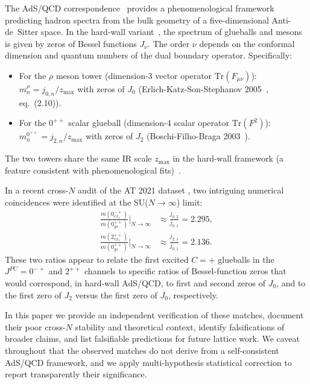 \documentclass[reprint,prd,amsmath,amssymb,nofootinbib,superscriptaddress]{revtex4-2}
\newcommand{\jbz}[2]{j_{#1,#2}}      %
\begin{document}
The AdS/QCD correspondence~\cite{Witten1998, PolchinskiStrassler2000} provides a phenomenological framework predicting hadron spectra from the bulk geometry of a five-dimensional Anti-de~Sitter space. In the hard-wall variant~\cite{ErlichKatzSonStephanov2005, BoschiFilhoBraga2002, DaRoldPomarol2005, deTeramondBrodsky2005}, the spectrum of glueballs and mesons is given by zeros of Bessel functions $J_\nu$. The order $\nu$ depends on the conformal dimension and quantum numbers of the dual boundary operator. Specifically:
\begin{itemize}
  \item For the $\rho$ meson tower (dimension-3 vector operator $\mathrm{Tr}(F_{\mu\nu})$): $m_n^\rho = \jbz{0}{n}/z_{\max}$ with zeros of $J_0$ (Erlich-Katz-Son-Stephanov 2005~\cite{ErlichKatzSonStephanov2005}, eq.~(2.10)).
  \item For the $0^{++}$ scalar glueball (dimension-4 scalar operator $\mathrm{Tr}(F^2)$): $m_n^{0^{++}} = \jbz{2}{n}/z_{\max}$ with zeros of $J_2$ (Boschi-Filho-Braga 2003~\cite{BoschiFilhoBraga2002}).
\end{itemize}
The two towers share the same IR scale $z_{\max}$ in the hard-wall framework (a feature consistent with phenomenological fits)~\cite{ErlichKatzSonStephanov2005, BoschiFilhoBraga2002}.

In a recent cross-$N$ audit of the AT 2021 dataset \cite{HybridFramework2026}, two intriguing numerical coincidences were identified at the SU($N \to \infty$) limit:
\begin{align}
  \frac{m(0^{-+}_{ex_1})}{m(0^{++}_{gs})}\Big|_{N \to \infty} &\approx \frac{\jbz{0}{2}}{\jbz{0}{1}} = 2.295,
  \label{eq:H1prime}\\
  \frac{m(2^{++}_{ex_1})}{m(0^{++}_{gs})}\Big|_{N \to \infty} &\approx \frac{\jbz{2}{1}}{\jbz{0}{1}} = 2.136.
  \label{eq:H2prime}
\end{align}
These two ratios appear to relate the first excited $C=+$ glueballs in the $J^{PC} = 0^{-+}$ and $2^{++}$ channels to specific ratios of Bessel-function zeros that would correspond, in hard-wall AdS/QCD, to first and second zeros of $J_0$, and to the first zero of $J_2$ versus the first zero of $J_0$, respectively.

In this paper we provide an independent verification of these matches, document their poor cross-$N$ stability and theoretical context, identify falsifications of broader claims, and list falsifiable predictions for future lattice work. We caveat throughout that the observed matches do not derive from a self-consistent AdS/QCD framework, and we apply multi-hypothesis statistical correction to report transparently their significance.
\end{document}
